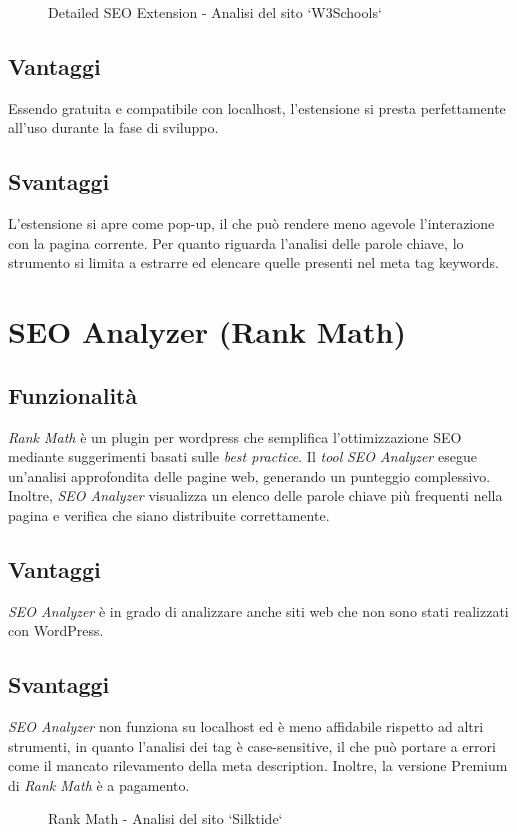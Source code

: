 \begin{figure}[H]
    \centering 
    \caption{Detailed SEO Extension - Analisi del sito `W3Schools`}
\end{figure}

\subsection{Vantaggi}
\par Essendo gratuita e compatibile con \gls{localhost}, l'estensione si presta perfettamente all'uso durante la fase di sviluppo.

\subsection{Svantaggi}
\par L'estensione si apre come pop-up, il che può rendere meno agevole l'interazione con la pagina corrente. Per quanto riguarda l'analisi delle parole chiave, lo strumento si limita a estrarre ed elencare quelle presenti nel meta tag keywords.

\section{SEO Analyzer (Rank Math)}

\subsection{Funzionalità}
\par \textit{Rank Math} è un plugin per \gls{wordpress} che semplifica l'ottimizzazione SEO mediante suggerimenti basati sulle \textit{best practice}. Il \textit{tool} \textit{SEO Analyzer} esegue un'analisi approfondita delle pagine web, generando un punteggio complessivo. Inoltre, \textit{SEO Analyzer} visualizza un elenco delle parole chiave più frequenti nella pagina e verifica che siano distribuite correttamente.

\subsection{Vantaggi}
\par \textit{SEO Analyzer} è in grado di analizzare anche siti web che non sono stati realizzati con WordPress.

\subsection{Svantaggi}
\par \textit{SEO Analyzer} non funziona su \gls{localhost} ed è meno affidabile rispetto ad altri strumenti, in quanto l'analisi dei tag è \gls{case-sensitive}, il che può portare a errori come il mancato rilevamento della meta description. Inoltre, la versione Premium di \textit{Rank Math} è a pagamento.

\begin{figure}[H]
    \centering 
    \caption{Rank Math - Analisi del sito `Silktide`}
\end{figure}